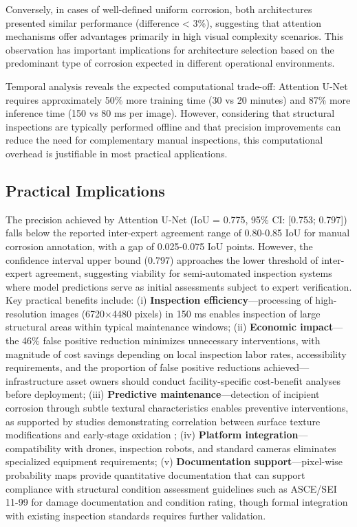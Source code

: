 \documentclass[Journal,letterpaper]{ascelike-new}
\begin{document}
Conversely, in cases of well-defined uniform corrosion, both architectures presented similar performance (difference < 3\%), suggesting that attention mechanisms offer advantages primarily in high visual complexity scenarios. This observation has important implications for architecture selection based on the predominant type of corrosion expected in different operational environments.

Temporal analysis reveals the expected computational trade-off: Attention U-Net requires approximately 50\% more training time (30 vs 20 minutes) and 87\% more inference time (150 vs 80 ms per image). However, considering that structural inspections are typically performed offline and that precision improvements can reduce the need for complementary manual inspections, this computational overhead is justifiable in most practical applications.

\subsection{Practical Implications}
\label{subsec:practical_implications}

The precision achieved by Attention U-Net (IoU = 0.775, 95\% CI: [0.753; 0.797]) falls below the reported inter-expert agreement range of 0.80-0.85 IoU for manual corrosion annotation, with a gap of 0.025-0.075 IoU points. However, the confidence interval upper bound (0.797) approaches the lower threshold of inter-expert agreement, suggesting viability for semi-automated inspection systems where model predictions serve as initial assessments subject to expert verification. Key practical benefits include: (i) \textbf{Inspection efficiency}---processing of high-resolution images (6720$\times$4480 pixels) in 150 ms enables inspection of large structural areas within typical maintenance windows; (ii) \textbf{Economic impact}---the 46\% false positive reduction minimizes unnecessary interventions, with magnitude of cost savings depending on local inspection labor rates, accessibility requirements, and the proportion of false positive reductions achieved---infrastructure asset owners should conduct facility-specific cost-benefit analyses before deployment; (iii) \textbf{Predictive maintenance}---detection of incipient corrosion through subtle textural characteristics enables preventive interventions, as supported by studies demonstrating correlation between surface texture modifications and early-stage oxidation \cite{thompson2023explainable,wang2023attention}; (iv) \textbf{Platform integration}---compatibility with drones, inspection robots, and standard cameras eliminates specialized equipment requirements; (v) \textbf{Documentation support}---pixel-wise probability maps provide quantitative documentation that can support compliance with structural condition assessment guidelines such as ASCE/SEI 11-99 for damage documentation and condition rating, though formal integration with existing inspection standards requires further validation.
\end{document}
